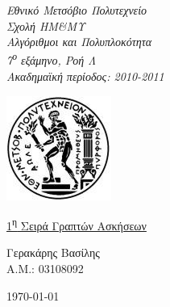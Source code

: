 \begin{titlepage}
\begin{center}

\noindent\begin{minipage}[b]{.55\textwidth}
\begin{Large}
\emph{Εθνικό Μετσόβιο Πολυτεχνείο\\
Σχολή ΗΜ\&ΜΥ\\
Αλγόριθμοι και Πολυπλοκότητα\\
7\textsuperscript{ο} εξάμηνο, Ροή Λ\\
Ακαδημαϊκή περίοδος: 2010-2011\\}
\end{Large}
\end{minipage}%
\begin{minipage}[b]{.45\textwidth}
     \centering
     \includegraphics[scale=0.8]{title/ntua_logo}
\end{minipage}

\vspace{5cm}
\begin{huge}
\underline{1\textsuperscript{η} Σειρά Γραπτών Ασκήσεων}
\end{huge}
\vfill

\begin{flushright}
\Large{Γερακάρης Βασίλης}\\
\large{Α.Μ.: 03108092}\\
\end{flushright}
\vspace{1cm}

\large\today\\
\end{center}
\end{titlepage}

